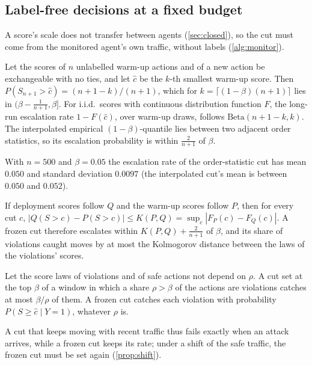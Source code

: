 \subsection{Label-free decisions at a fixed budget}
A score's scale does not transfer between agents (\cref{sec:closed}), so the cut must come from the monitored agent's own traffic, without labels (\cref{alg:monitor}).
\begin{proposition}\label{prop:frozen}
Let the scores of $n$ unlabelled warm-up actions and of a new action be exchangeable with no ties, and let $\hat c$ be the $k$-th smallest warm-up score. Then $P(S_{n+1}>\hat c)=(n+1-k)/(n+1)$, which for $k=\lceil(1-\beta)(n+1)\rceil$ lies in $\big(\beta-\tfrac1{n+1},\beta\big]$. For i.i.d.\ scores with continuous distribution function $F$, the long-run escalation rate $1-F(\hat c)$, over warm-up draws, follows $\mathrm{Beta}(n+1-k,k)$. The interpolated empirical $(1-\beta)$-quantile lies between two adjacent order statistics, so its escalation probability is within $\tfrac{2}{n+1}$ of $\beta$.
\end{proposition}
With $n=500$ and $\beta=0.05$ the escalation rate of the order-statistic cut has mean $0.050$ and standard deviation $0.0097$ (the interpolated cut's mean is between $0.050$ and $0.052$).
\begin{proposition}[shift]\label{prop:shift}
If deployment scores follow $Q$ and the warm-up scores follow $P$, then for every cut $c$, $|Q(S>c)-P(S>c)|\le K(P,Q)=\sup_c|F_P(c)-F_Q(c)|$. A frozen cut therefore escalates within $K(P,Q)+\tfrac2{n+1}$ of $\beta$, and its share of violations caught moves by at most the Kolmogorov distance between the laws of the violations' scores.
\end{proposition}
\begin{proposition}[bursts]\label{prop:burst}
Let the score laws of violations and of safe actions not depend on $\rho$. A cut set at the top $\beta$ of a window in which a share $\rho>\beta$ of the actions are violations catches at most $\beta/\rho$ of them. A frozen cut catches each violation with probability $P(S\ge\hat c\mid Y=1)$, whatever $\rho$ is.
\end{proposition}
A cut that keeps moving with recent traffic thus fails exactly when an attack arrives, while a frozen cut keeps its rate; under a shift of the safe traffic, the frozen cut must be set again (\cref{prop:shift}).

